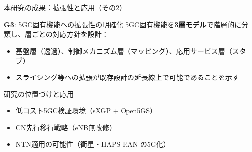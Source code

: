 \documentclass[dvipdfmx,11pt,aspectratio=169]{beamer}
\begin{document}
\begin{frame}{本研究の成果：拡張性と応用（その2）}
  \begin{block}{\textbf{G3}: 5GC固有機能への拡張性の明確化}
    5GC固有機能を\textbf{3層モデル}で階層的に分類し、層ごとの対応方針を設計：
    \begin{itemize}
      \small
      \item 基盤層（透過）、制御メカニズム層（マッピング）、応用サービス層（スタブ）
      \item スライシング等への拡張が既存設計の延長線上で可能であることを示す
    \end{itemize}
  \end{block}

  \begin{block}{研究の位置づけと応用}
    \begin{itemize}
      \small
      \item 低コスト5GC検証環境（sXGP + Open5GS）
      \item CN先行移行戦略（eNB無改修）
      \item NTN適用の可能性（衛星・HAPS RAN の5G化）
    \end{itemize}
  \end{block}
\end{frame}
\end{document}
